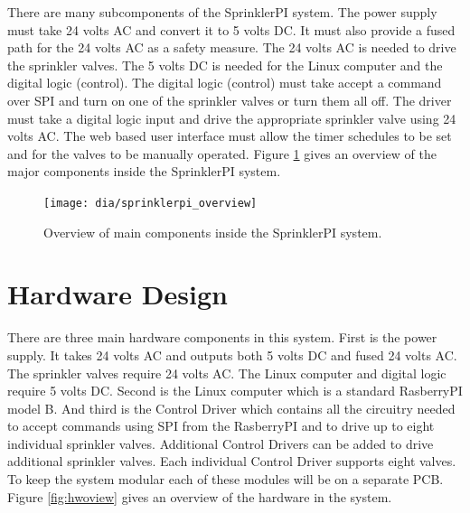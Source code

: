 \documentclass{article}
\begin{document}
There are many subcomponents of the SprinklerPI system.
The power supply must take 24 volts AC and convert it to 5 volts DC.
It must also provide a fused path for the 24 volts AC as a safety measure.
The 24 volts AC is needed to drive the sprinkler valves.
The 5 volts DC is needed for the Linux computer and the digital logic (control).
The digital logic (control) must take accept a command over SPI
and turn on one of the sprinkler valves or turn them all off.
The driver must take a digital logic input and drive the appropriate
sprinkler valve using 24 volts AC.
The web based user interface must allow the timer schedules to be
set and for the valves to be manually operated.
Figure \ref{fig:spioview} gives an overview of the major components
inside the SprinklerPI system.

\begin{figure}[h!]
\begin{center}
\texttt{[image: dia/sprinklerpi\_overview]}
\end{center}
\caption{Overview of main components inside the SprinklerPI system.}
\label{fig:spioview}
\end{figure}


\clearpage
\section{Hardware Design}
\label{sec:hardware}

There are three main hardware components in this system.
First is the power supply.
It takes 24 volts AC and outputs both 5 volts DC and fused 24 volts AC.
The sprinkler valves require 24 volts AC.
The Linux computer and digital logic require 5 volts DC.
Second is the Linux computer which is a standard RasberryPI model B.
And third is the Control Driver which contains all the
circuitry needed to accept commands using SPI from the RasberryPI
and to drive up to eight individual sprinkler valves.
Additional Control Drivers can be added to drive additional sprinkler
valves.
Each individual Control Driver supports eight valves.
To keep the system modular each of these modules will be on a
separate PCB.
Figure \ref{fig:hwoview} gives an overview of the hardware in the system.
\end{document}
